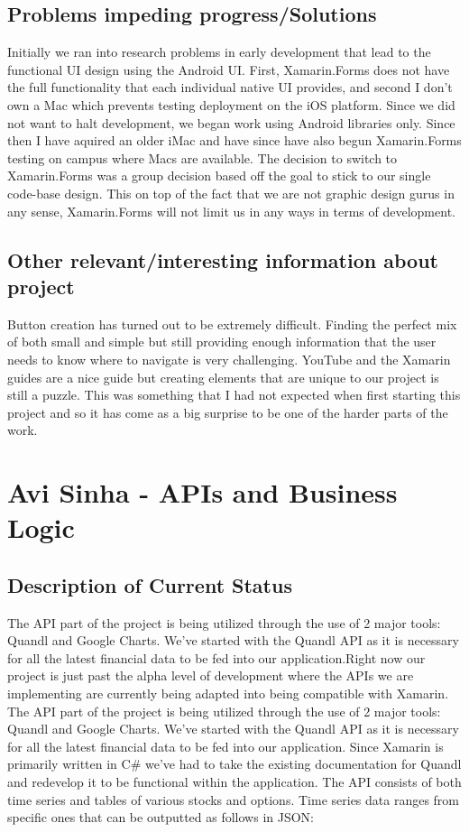 \documentclass[letterpaper,10pt,titlepage,journal,compsoc,draftclsnofoot,onecolumn]{IEEEtran}
\begin{document}
\subsection{Problems impeding progress/Solutions}

Initially we ran into research problems in early development that lead to the functional UI design using the Android UI. First, Xamarin.Forms does not have the full functionality that each individual native UI provides, and second I don't own a Mac which prevents testing deployment on the iOS platform. Since we did not want to halt development, we began work using Android libraries only. Since then I have aquired an older iMac and have since have also begun Xamarin.Forms testing on campus where Macs are available. The decision to switch to Xamarin.Forms was a group decision based off the goal to stick to our single code-base design. This on top of the fact that we are not graphic design gurus in any sense, Xamarin.Forms will not limit us in any ways in terms of development.

\subsection{Other relevant/interesting information about project}

Button creation has turned out to be extremely difficult. Finding the perfect mix of both small and simple but still providing enough information that the user needs to know where to navigate is very challenging. YouTube and the Xamarin guides are a nice guide but creating elements that are unique to our project is still a puzzle. This was something that I had not expected when first starting this project and so it has come as a big surprise to be one of the harder parts of the work.

\section{Avi Sinha - APIs and Business Logic}

\subsection{Description of Current Status}
The API part of the project is being utilized through the use of 2 major tools: Quandl and Google Charts. We've started with the Quandl API as it is necessary for all the latest financial data to be fed into our application.Right now our project is just past the alpha level of development where the APIs we are implementing are currently being adapted into being compatible with Xamarin. 
The API part of the project is being utilized through the use of 2 major tools: Quandl and Google Charts. We've started with the Quandl API as it is necessary for all the latest financial data to be fed into our application. Since Xamarin is primarily written in C\# we've had to take the existing documentation for Quandl and redevelop it to be functional within the application. The API consists of both time series and tables of various stocks and options. Time series data ranges from specific ones that can be outputted as follows in JSON: 
\end{document}
